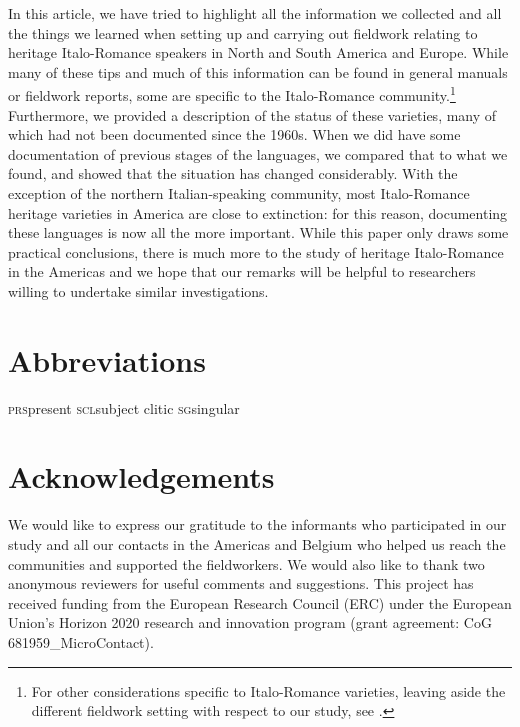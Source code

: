 \documentclass[output=paper,hidelinks]{langscibook}
\begin{document}
In this article, we have tried to highlight all the information we collected and all the things we learned when setting up and carrying out fieldwork relating to heritage Italo-Romance speakers in North and South America and Europe. While many of these tips and much of this information can be found in general manuals or fieldwork reports, some are specific to the Italo-Romance community.\footnote{For other considerations specific to Italo-Romance varieties, leaving aside the different fieldwork setting with respect to our study, see \citealt{CornipsPoletto2005}.} Furthermore, we provided a description of the status of these varieties, many of which had not been documented since the 1960s. When we did have some documentation of previous stages of the languages, we compared that to what we found, and showed that the situation has changed considerably. With the exception of the northern Italian-speaking community, most Italo-Romance heritage varieties in America are close to extinction: for this reason, documenting these languages is now all the more important. While this paper only draws some practical conclusions, there is much more to the study of heritage Italo-Romance in the Americas and we hope that our remarks will be helpful to researchers willing to undertake similar investigations. 

\section*{Abbreviations}

\textsc{prs}\quad  present\qquad
\textsc{scl}\quad  subject clitic\qquad
\textsc{sg}\quad   singular

\section*{Acknowledgements}
We would like to express our gratitude to the informants who participated in our study and all our contacts in the Americas and Belgium who helped us reach the communities and supported the fieldworkers. We would also like to thank two anonymous reviewers for useful comments and suggestions. This project has received funding from the European Research Council (ERC) under the European Union's Horizon 2020 research and innovation program (grant agreement: CoG 681959\_MicroContact).

\sloppy
\printbibliography[heading=subbibliography,notkeyword=this]
\clearpage
\end{document}

